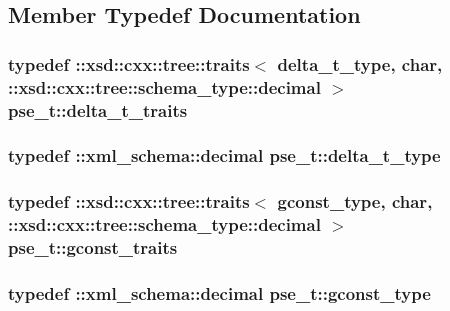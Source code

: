 \subsection{Member Typedef Documentation}
\hypertarget{classpse__t_a02b088d0313bad0fedf219ccf44ebe48}{
\subsubsection[{delta\-\_\-t\-\_\-traits}]{\setlength{\rightskip}{0pt plus 5cm}typedef \-::xsd\-::cxx\-::tree\-::traits$<$ {\bf delta\-\_\-t\-\_\-type}, char, \-::xsd\-::cxx\-::tree\-::schema\-\_\-type\-::decimal $>$ {\bf pse\-\_\-t\-::delta\-\_\-t\-\_\-traits}}}\label{classpse__t_a02b088d0313bad0fedf219ccf44ebe48}
\hypertarget{classpse__t_a7af94a081ff80545fa4d069c4ba56b57}{
\subsubsection[{delta\-\_\-t\-\_\-type}]{\setlength{\rightskip}{0pt plus 5cm}typedef \-::{\bf xml\-\_\-schema\-::decimal} {\bf pse\-\_\-t\-::delta\-\_\-t\-\_\-type}}}\label{classpse__t_a7af94a081ff80545fa4d069c4ba56b57}
\hypertarget{classpse__t_a9074dfb701a5e94c508dda07a4afe61b}{
\subsubsection[{gconst\-\_\-traits}]{\setlength{\rightskip}{0pt plus 5cm}typedef \-::xsd\-::cxx\-::tree\-::traits$<$ {\bf gconst\-\_\-type}, char, \-::xsd\-::cxx\-::tree\-::schema\-\_\-type\-::decimal $>$ {\bf pse\-\_\-t\-::gconst\-\_\-traits}}}\label{classpse__t_a9074dfb701a5e94c508dda07a4afe61b}
\hypertarget{classpse__t_a86b52d56dfb0c43a023d8bda8b4a19ed}{
\subsubsection[{gconst\-\_\-type}]{\setlength{\rightskip}{0pt plus 5cm}typedef \-::{\bf xml\-\_\-schema\-::decimal} {\bf pse\-\_\-t\-::gconst\-\_\-type}}}\label{classpse__t_a86b52d56dfb0c43a023d8bda8b4a19ed}
